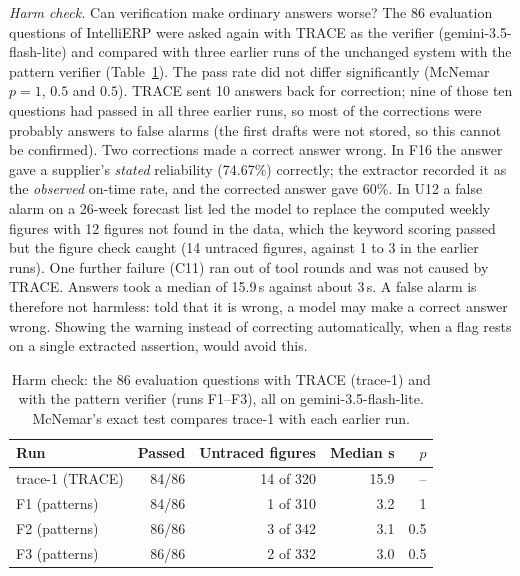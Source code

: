 \documentclass[journal]{IEEEtran}
\renewcommand{\paragraph}[1]{\par\textit{#1}\enspace}
\begin{document}
\paragraph{Harm check.} Can verification make ordinary answers worse? The 86 evaluation questions of
IntelliERP were asked again with TRACE as the verifier (gemini-3.5-flash-lite) and compared with three
earlier runs of the unchanged system with the pattern verifier (Table~\ref{tab:harm}). The pass rate did not
differ significantly (McNemar $p=1$, $0.5$ and $0.5$). TRACE sent 10 answers back for correction; nine of
those ten questions had passed in all three earlier runs, so most of the corrections were probably answers
to false alarms (the first drafts were not stored, so this cannot be confirmed). Two corrections made a
correct answer wrong. In F16 the answer gave a supplier's \emph{stated} reliability (74.67\%) correctly; the
extractor recorded it as the \emph{observed} on-time rate, and the corrected answer gave 60\%. In U12 a false
alarm on a 26-week forecast list led the model to replace the computed weekly figures with 12 figures not
found in the data, which the keyword scoring passed but the figure check caught (14 untraced figures, against
1 to 3 in the earlier runs). One further failure (C11) ran out of tool rounds and was not caused by TRACE.
Answers took a median of 15.9\,s against about 3\,s. A false alarm is therefore not harmless: told that it is
wrong, a model may make a correct answer wrong. Showing the warning instead of correcting automatically, when
a flag rests on a single extracted assertion, would avoid this.

\begin{table}[t]
\centering\footnotesize
\caption{Harm check: the 86 evaluation questions with TRACE (trace-1) and with the pattern verifier (runs
F1--F3), all on gemini-3.5-flash-lite. McNemar's exact test compares trace-1 with each earlier run.}
\label{tab:harm}
\begin{tabular}{@{}lrrrr@{}}
\toprule
Run & Passed & Untraced figures & Median s & $p$ \\
\midrule
trace-1 (TRACE) & 84/86 & 14 of 320 & 15.9 & -- \\
F1 (patterns) & 84/86 & 1 of 310 & 3.2 & 1 \\
F2 (patterns) & 86/86 & 3 of 342 & 3.1 & 0.5 \\
F3 (patterns) & 86/86 & 2 of 332 & 3.0 & 0.5 \\
\bottomrule
\end{tabular}
\end{table}
\end{document}
